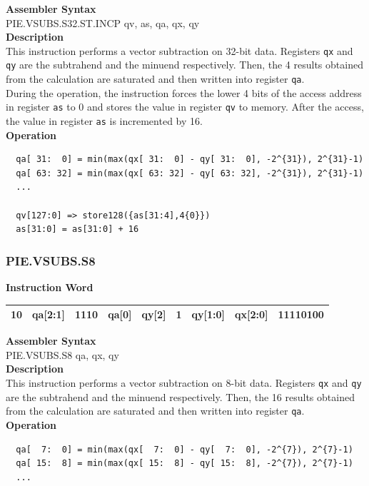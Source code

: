 \textbf{Assembler Syntax} \\
PIE.VSUBS.S32.ST.INCP qv, as, qa, qx, qy \\
\textbf{Description} \\
This instruction performs a vector subtraction on 32-bit data. Registers \lstinline{qx} and \lstinline{qy} are the subtrahend and the minuend respectively. Then, the 4 results obtained from the calculation are saturated and then written into register \lstinline{qa}. \\ During the operation, the instruction forces the lower 4 bits of the access address in register \lstinline{as} to 0 and stores the value in register \lstinline{qv} to memory. After the access, the value in register \lstinline{as} is incremented by 16.\\
\textbf{Operation}
\begin{lstlisting}
  qa[ 31:  0] = min(max(qx[ 31:  0] - qy[ 31:  0], -2^{31}), 2^{31}-1)
  qa[ 63: 32] = min(max(qx[ 63: 32] - qy[ 63: 32], -2^{31}), 2^{31}-1)
  ...

  qv[127:0] => store128({as[31:4],4{0}})
  as[31:0] = as[31:0] + 16
\end{lstlisting}

\newpage
\subsubsection{PIE.VSUBS.S8}\label{instruction:PIEVSUBSS8}
\setlength\tabcolsep{6pt}
\textbf{Instruction Word} \\
\begin{tabular}{|c|c|c|c|c|c|c|c|c|}
	\hline
	10 & qa[2:1] & 1110 & qa[0] & qy[2] & 1 & qy[1:0] & qx[2:0] & 11110100 \\
	\hline
\end{tabular}

\textbf{Assembler Syntax} \\
PIE.VSUBS.S8 qa, qx, qy \\
\textbf{Description} \\
This instruction performs a vector subtraction on 8-bit data. Registers \lstinline{qx} and \lstinline{qy} are the subtrahend and the minuend respectively. Then, the 16 results obtained from the calculation are saturated and then written into register \lstinline{qa}.\\
\textbf{Operation}
\begin{lstlisting}
  qa[  7:  0] = min(max(qx[  7:  0] - qy[  7:  0], -2^{7}), 2^{7}-1)
  qa[ 15:  8] = min(max(qx[ 15:  8] - qy[ 15:  8], -2^{7}), 2^{7}-1)
  ...
\end{lstlisting}

